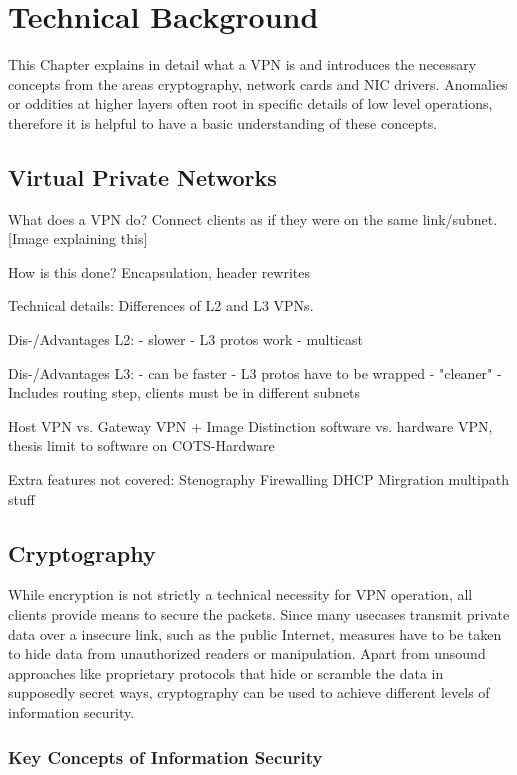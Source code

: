 \chapter{Technical Background}
\label{chap:background}

This Chapter explains in detail what a VPN is and introduces the necessary concepts from the areas cryptography, network cards and NIC drivers. Anomalies or oddities at higher layers often root in specific details of low level operations, therefore it is helpful to have a basic understanding of these concepts.

\section{Virtual Private Networks}
What does a VPN do?
Connect clients as if they were on the same link/subnet. 
[Image explaining this]

How is this done?
Encapsulation, header rewrites

Technical details:
Differences of L2 and L3 VPNs.

Dis-/Advantages L2:
- slower
- L3 protos work
- multicast

Dis-/Advantages L3:
- can be faster
- L3 protos have to be wrapped
- "cleaner"
- Includes routing step, clients must be in different subnets

Host VPN vs. Gateway VPN + Image
Distinction software vs. hardware VPN, thesis limit to software on COTS-Hardware

Extra features not covered:
Stenography
Firewalling
DHCP
Mirgration
multipath stuff

\section{Cryptography}
While encryption is not strictly a technical necessity for VPN operation, all clients provide means to secure the packets. Since many usecases transmit private data over a insecure link, such as the public Internet, measures have to be taken to hide data from unauthorized readers or manipulation.
Apart from unsound approaches like proprietary protocols that hide or scramble the data in supposedly secret ways, cryptography can be used to achieve different levels of information security. 

\subsection{Key Concepts of Information Security}

